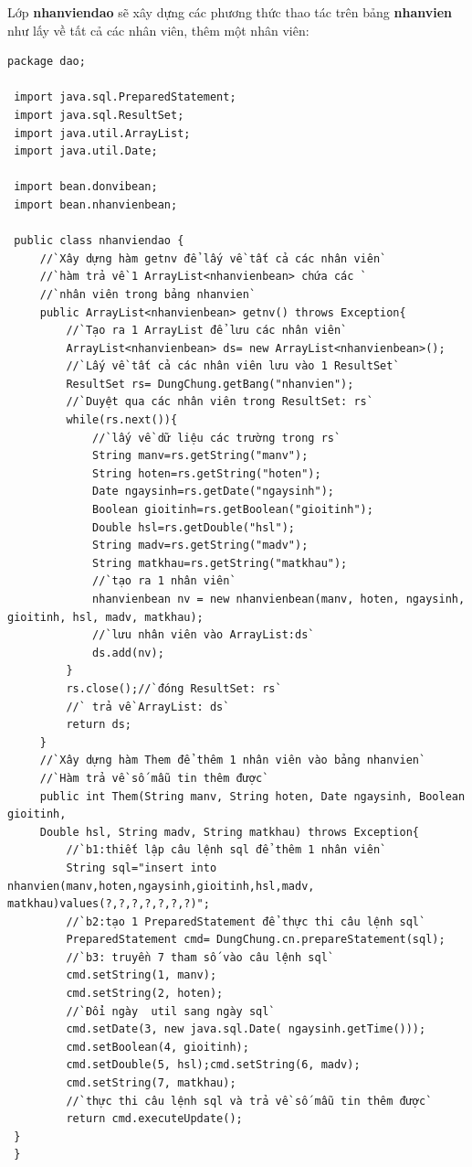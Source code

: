  Lớp \textbf{nhanviendao} sẽ xây dựng các phương thức thao tác trên bảng \textbf{nhanvien} như lấy về tất cả các nhân viên, thêm một nhân viên:
 \begin{lstlisting}[escapechar=`]
 package dao;
 
 import java.sql.PreparedStatement;
 import java.sql.ResultSet;
 import java.util.ArrayList;
 import java.util.Date;
 
 import bean.donvibean;
 import bean.nhanvienbean;
 
 public class nhanviendao {
	 //`Xây dựng hàm getnv để lấy về tất cả các nhân viên`
	 //`hàm trả về 1 ArrayList<nhanvienbean> chứa các `
	 //`nhân viên trong bảng nhanvien`
	 public ArrayList<nhanvienbean> getnv() throws Exception{
		 //`Tạo ra 1 ArrayList để lưu các nhân viên`
		 ArrayList<nhanvienbean> ds= new ArrayList<nhanvienbean>();
		 //`Lấy về tất cả các nhân viên lưu vào 1 ResultSet`
		 ResultSet rs= DungChung.getBang("nhanvien");
		 //`Duyệt qua các nhân viên trong ResultSet: rs`
		 while(rs.next()){
			 //`lấy về dữ liệu các trường trong rs`
			 String manv=rs.getString("manv");
			 String hoten=rs.getString("hoten");
			 Date ngaysinh=rs.getDate("ngaysinh");
			 Boolean gioitinh=rs.getBoolean("gioitinh");
			 Double hsl=rs.getDouble("hsl");
			 String madv=rs.getString("madv");
			 String matkhau=rs.getString("matkhau");
			 //`tạo ra 1 nhân viên`
			 nhanvienbean nv = new nhanvienbean(manv, hoten, ngaysinh, gioitinh, hsl, madv, matkhau);
			 //`lưu nhân viên vào ArrayList:ds`
			 ds.add(nv);
		 } 
		 rs.close();//`đóng ResultSet: rs`
		 //` trả về ArrayList: ds`
		 return ds;
	 }
	 //`Xây dựng hàm Them để thêm 1 nhân viên vào bảng nhanvien`	
	 //`Hàm trả về số mẫu tin thêm được`
	 public int Them(String manv, String hoten, Date ngaysinh, Boolean gioitinh,
	 Double hsl, String madv, String matkhau) throws Exception{
		 //`b1:thiết lập câu lệnh sql để thêm 1 nhân viên`
		 String sql="insert into nhanvien(manv,hoten,ngaysinh,gioitinh,hsl,madv, matkhau)values(?,?,?,?,?,?,?)";
		 //`b2:tạo 1 PreparedStatement để thực thi câu lệnh sql`
		 PreparedStatement cmd= DungChung.cn.prepareStatement(sql);
		 //`b3: truyền 7 tham số vào câu lệnh sql`
		 cmd.setString(1, manv);
		 cmd.setString(2, hoten);
		 //`Đổi ngày  util sang ngày sql`
		 cmd.setDate(3, new java.sql.Date( ngaysinh.getTime()));
		 cmd.setBoolean(4, gioitinh);
		 cmd.setDouble(5, hsl);cmd.setString(6, madv);
		 cmd.setString(7, matkhau);
		 //`thực thi câu lệnh sql và trả về số mẫu tin thêm được`
		 return cmd.executeUpdate();
 }
 }
 \end{lstlisting}
 
